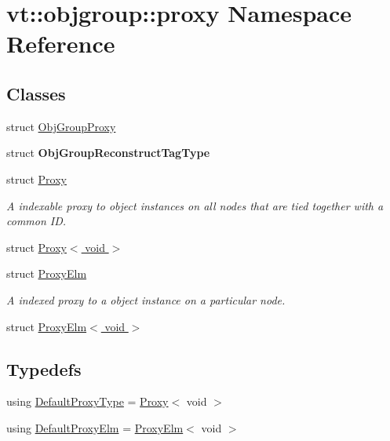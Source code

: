 \hypertarget{namespacevt_1_1objgroup_1_1proxy}{}\section{vt\+:\+:objgroup\+:\+:proxy Namespace Reference}
\label{namespacevt_1_1objgroup_1_1proxy}
\subsection*{Classes}
\begin{DoxyCompactItemize}
\item 
struct \hyperlink{structvt_1_1objgroup_1_1proxy_1_1_obj_group_proxy}{Obj\+Group\+Proxy}
\item 
struct {\bfseries Obj\+Group\+Reconstruct\+Tag\+Type}
\item 
struct \hyperlink{structvt_1_1objgroup_1_1proxy_1_1_proxy}{Proxy}
\begin{DoxyCompactList}\small\item\em A indexable proxy to object instances on all nodes that are tied together with a common ID. \end{DoxyCompactList}\item 
struct \hyperlink{structvt_1_1objgroup_1_1proxy_1_1_proxy_3_01void_01_4}{Proxy$<$ void $>$}
\item 
struct \hyperlink{structvt_1_1objgroup_1_1proxy_1_1_proxy_elm}{Proxy\+Elm}
\begin{DoxyCompactList}\small\item\em A indexed proxy to a object instance on a particular node. \end{DoxyCompactList}\item 
struct \hyperlink{structvt_1_1objgroup_1_1proxy_1_1_proxy_elm_3_01void_01_4}{Proxy\+Elm$<$ void $>$}
\end{DoxyCompactItemize}
\subsection*{Typedefs}
\begin{DoxyCompactItemize}
\item 
using \hyperlink{namespacevt_1_1objgroup_1_1proxy_ac7e0a0acb3b31d5469a603de08192adc}{Default\+Proxy\+Type} = \hyperlink{structvt_1_1objgroup_1_1proxy_1_1_proxy}{Proxy}$<$ void $>$
\item 
using \hyperlink{namespacevt_1_1objgroup_1_1proxy_ae207233400f23aa10c30217cdb369c54}{Default\+Proxy\+Elm} = \hyperlink{structvt_1_1objgroup_1_1proxy_1_1_proxy_elm}{Proxy\+Elm}$<$ void $>$
\end{DoxyCompactItemize}

